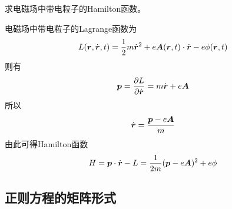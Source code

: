 \begin{example}[电磁场中带电粒子的Hamilton函数]
求电磁场中带电粒子的Hamilton函数。
\end{example}
\begin{solution}
电磁场中带电粒子的Lagrange函数为
\begin{equation*}
	L(\boldsymbol{r},\dot{\boldsymbol{r}},t) = \frac12 m \dot{\boldsymbol{r}}^2 + e\boldsymbol{A}(\boldsymbol{r},t) \cdot \dot{\boldsymbol{r}} - e\phi(\boldsymbol{r},t)
\end{equation*}
则有
\begin{equation*}
	\boldsymbol{p} = \frac{\partial L}{\partial \dot{\boldsymbol{r}}} = m\dot{\boldsymbol{r}} + e\boldsymbol{A}
\end{equation*}
所以
\begin{equation*}
	\dot{\boldsymbol{r}} = \frac{\boldsymbol{p} - e\boldsymbol{A}}{m}
\end{equation*}
由此可得Hamilton函数
\begin{equation*}
	H = \boldsymbol{p} \cdot \dot{\boldsymbol{r}} - L = \frac{1}{2m} (\boldsymbol{p}-e\boldsymbol{A})^2 + e\phi
\end{equation*}
\end{solution}

\subsection{正则方程的矩阵形式}

